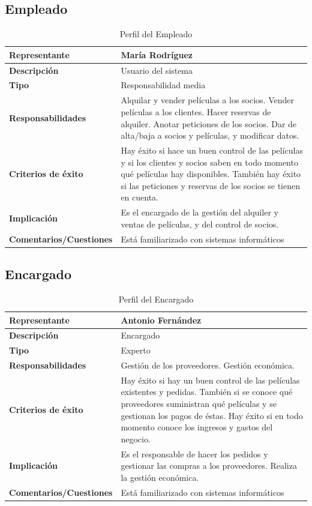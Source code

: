 \subsection*{Empleado}

\begin{table}[H]
\centering
\begin{tabular}{|p{5cm}|p{10cm}|}
\hline
\rowcolor[HTML]{CFE2F3} 
\textbf{Representante} & María Rodríguez \\ \hline
\textbf{Descripción} & Usuario del sistema \\ \hline
\textbf{Tipo} & Responsabilidad media \\ \hline
\textbf{Responsabilidades} & Alquilar y vender películas a los socios. Vender películas a los clientes. Hacer reservas de alquiler. Anotar peticiones de los socios. Dar de alta/baja a socios y películas, y modificar datos. \\ \hline
\textbf{Criterios de éxito} & Hay éxito si hace un buen control de las películas y si los clientes y socios saben en todo momento qué películas hay disponibles. También hay éxito si las peticiones y reservas de los socios se tienen en cuenta. \\ \hline
\textbf{Implicación} & Es el encargado de la gestión del alquiler y ventas de películas, y del control de socios. \\ \hline
\textbf{Comentarios/Cuestiones} & Está familiarizado con sistemas informáticos \\ \hline
\end{tabular}
\caption{Perfil del Empleado}
\label{tab:perfil_empleado}
\end{table}

\subsection*{Encargado}

\begin{table}[H]
\centering
\begin{tabular}{|p{5cm}|p{10cm}|}
\hline
\rowcolor[HTML]{CFE2F3} 
\textbf{Representante} & Antonio Fernández \\ \hline
\textbf{Descripción} & Encargado \\ \hline
\textbf{Tipo} & Experto \\ \hline
\textbf{Responsabilidades} & Gestión de los proveedores. Gestión económica. \\ \hline
\textbf{Criterios de éxito} & Hay éxito si hay un buen control de las películas existentes y pedidas. También si se conoce qué proveedores suministran qué películas y se gestionan los pagos de éstas. Hay éxito si en todo momento conoce los ingresos y gastos del negocio. \\ \hline
\textbf{Implicación} & Es el responsable de hacer los pedidos y gestionar las compras a los proveedores. Realiza la gestión económica. \\ \hline
\textbf{Comentarios/Cuestiones} & Está familiarizado con sistemas informáticos \\ \hline
\end{tabular}
\caption{Perfil del Encargado}
\label{tab:perfil_encargado}
\end{table}

